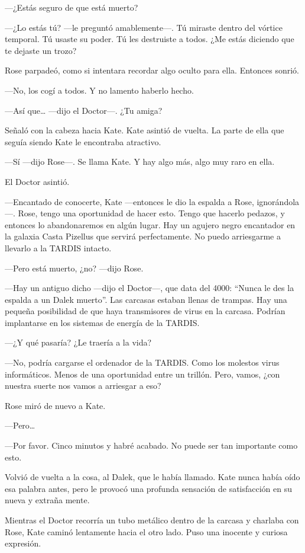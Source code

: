 ---¿Estás seguro de que está muerto?

---¿Lo estás tú? ---le preguntó amablemente---. Tú miraste dentro del
vórtice temporal. Tú usaste su poder. Tú les destruiste a todos. ¿Me
estás diciendo que te dejaste un trozo?

Rose parpadeó, como si intentara recordar algo oculto para ella.
Entonces sonrió.

---No, los cogí a todos. Y no lamento haberlo hecho.

---Así que\ldots{} ---dijo el Doctor---. ¿Tu amiga?

Señaló con la cabeza hacia Kate. Kate asintió de vuelta. La parte de
ella que seguía siendo Kate le encontraba atractivo.

---Sí ---dijo Rose---. Se llama Kate. Y hay algo más, algo muy raro en
ella.

El Doctor asintió.

---Encantado de conocerte, Kate ---entonces le dio la espalda a Rose,
ignorándola---. Rose, tengo una oportunidad de hacer esto. Tengo que
hacerlo pedazos, y entonces lo abandonaremos en algún lugar. Hay un
agujero negro encantador en la galaxia Casta Pizellus que servirá
perfectamente. No puedo arriesgarme a llevarlo a la TARDIS intacto.

---Pero está muerto, ¿no? ---dijo Rose.

---Hay un antiguo dicho ---dijo el Doctor---, que data del 4000: ``Nunca le
des la espalda a un Dalek muerto''. Las carcasas estaban llenas de
trampas. Hay una pequeña posibilidad de que haya transmisores de virus
en la carcasa. Podrían implantarse en los sistemas de energía de la
TARDIS.

---¿Y qué pasaría? ¿Le traería a la vida?

---No, podría cargarse el ordenador de la TARDIS. Como los molestos virus
informáticos. Menos de una oportunidad entre un trillón. Pero, vamos,
¿con nuestra suerte nos vamos a arriesgar a eso?

Rose miró de nuevo a Kate.

---Pero\ldots{}

---Por favor. Cinco minutos y habré acabado. No puede ser tan importante
como esto.

Volvió de vuelta a la cosa, al Dalek, que le había llamado. Kate nunca
había oído esa palabra antes, pero le provocó una profunda sensación de
satisfacción en su nueva y extraña mente.

Mientras el Doctor recorría un tubo metálico dentro de la carcasa y
charlaba con Rose, Kate caminó lentamente hacia el otro lado. Puso una
inocente y curiosa expresión.

